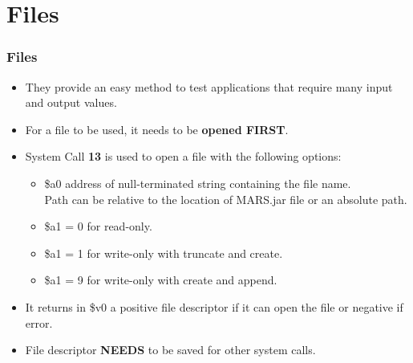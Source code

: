 \documentclass[
	10pt, %
	hmargin=1cm,vmargin=0cm,head=0.5cm,headsep=0pt,foot=0.5cm,margin=2cm
]{beamer}
\begin{document}
\section{Files}
\begin{frame}
	\frametitle{Files}
	\begin{itemize}
		\item They provide an easy method to test applications that require many input and output values. \pause
		\item For a file to be used, it needs to be \textbf{opened FIRST}. \pause
		\item System Call \textbf{13} is used to open a file with the following options:
			\begin{itemize}
			\item \color{red}\$a0\color{black}\hspace{.05cm} address of null-terminated string containing the file name. \\
			Path can be relative to the location of MARS.jar file or an absolute path.
			\item \color{red}\$a1\color{black}\hspace{.05cm} = 0 for read-only.
			\item \color{red}\$a1\color{black}\hspace{.05cm} = 1 for write-only with truncate and create.
			\item \color{red}\$a1\color{black}\hspace{.05cm} = 9 for write-only with create and append.
			\end{itemize}
		\item It returns in \color{red}\$v0\color{black}\hspace{.05cm} a positive file descriptor if it can open the file or negative if error.
		\item File descriptor \textbf{NEEDS} to be saved for other system calls.
	\end{itemize}
\end{frame}
\end{document}
